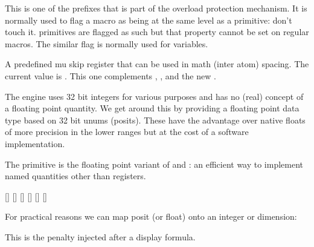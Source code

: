 \stopoldprimitive

\startnewprimitive[title={\prm {permanent}}]

This is one of the prefixes that is part of the overload protection mechanism. It
is normally used to flag a macro as being at the same level as a primitive: don't
touch it. primitives are flagged as such but that property cannot be set on
regular macros. The similar  flag is normally used for variables.

\stopnewprimitive

\startnewprimitive[title={\prm {pettymuskip}}]

A predefined mu skip register that can be used in math (inter atom) spacing. The
current value is {\tt \the\pettymuskip}. This one complements ,
,  and the new .

\stopnewprimitive

\startnewprimitive[title={\prm {positdef}}]

The engine uses 32 bit integers for various purposes and has no (real) concept of
a floating point quantity. We get around this by providing a floating point data
type based on 32 bit unums (posits). These have the advantage over native floats
of more precision in the lower ranges but at the cost of a software
implementation.

The  primitive is the floating point variant of 
and : an efficient way to implement named quantities other
than registers.

\startbuffer
\positdef     {}
\positdef     {}
[\the\MyFloatA] [\todimension\MyFloatA] [\tointeger\MyFloatA]
[\the\MyFloatB] [\todimension\MyFloatB] [\tointeger\MyFloatB]
\stopbuffer

\typebuffer

For practical reasons we can map posit (or float) onto an integer or dimension:

\startlines
\getbuffer
\stoplines


\stopnewprimitive

\startoldprimitive[title={\prm {postdisplaypenalty}}]

This is the penalty injected after a display formula.

\stopoldprimitive

